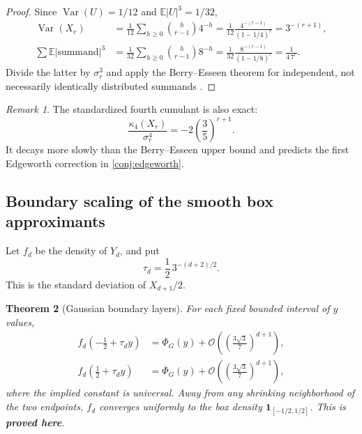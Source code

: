 \documentclass[11pt,oneside]{article}
\numberwithin{equation}{section}
\newtheorem{theorem}{Theorem}[section]
\theoremstyle{definition}
\theoremstyle{remark}
\newtheorem{remark}[theorem]{Remark}
\newcommand{\E}{\mathbb E}
\newcommand{\Var}{\operatorname{Var}}
\newcommand{\bigO}{\mathcal O}
\newcommand{\statusproved}{\textcolor{deepgreen}{\textbf{proved here}}}
\newcommand{\NormalCDF}{\Phi_{\!G}}
\newcommand{\NormalSurv}{\overline{\Phi}_{\!G}}
\begin{document}
\begin{proof}
Since $\Var(U)=1/12$ and $\E|U|^3=1/32$,
\begin{align*}
 \Var(X_r)
 &=\frac1{12}\sum_{h\ge0}\binom h{r-1}4^{-h}
 =\frac1{12}\frac{4^{-(r-1)}}{(1-1/4)^r}
 =3^{-(r+1)},\\
 \sum\E|\text{summand}|^3
 &=\frac1{32}\sum_{h\ge0}\binom h{r-1}8^{-h}
 =\frac1{32}\frac{8^{-(r-1)}}{(1-1/8)^r}
 =\frac1{4\,7^r}.
\end{align*}
Divide the latter by $\sigma_r^3$ and apply the Berry--Esseen theorem for independent,
not necessarily identically distributed summands \cite{petrov1995}.
\end{proof}

\begin{remark}
The standardized fourth cumulant is also exact:
\begin{equation}
 \frac{\kappa_4(X_r)}{\sigma_r^4}
 =-2\left(\frac35\right)^{r+1}.
 \label{eq:pascal-standardized-k4}
\end{equation}
It decays more slowly than the Berry--Esseen upper bound and predicts the first Edgeworth
correction in \cref{conj:edgeworth}.
\end{remark}

\subsection{Boundary scaling of the smooth box approximants}

Let $f_d$ be the density of $Y_d$, and put
\begin{equation}
 \tau_d=\frac12\,3^{-(d+2)/2}.
 \label{eq:tau-d}
\end{equation}
This is the standard deviation of $X_{d+1}/2$.

\begin{theorem}[Gaussian boundary layers]
\label{thm:boundary-layer}
For each fixed bounded interval of $y$ values,
\begin{align}
 f_d\!\left(-\frac12+\tau_dy\right)
 &=\NormalCDF(y)+
   \bigO\!\left(\left(\frac{3\sqrt3}{7}\right)^{d+1}\right),
 \label{eq:left-boundary}\\
 f_d\!\left(\frac12+\tau_dy\right)
 &=\NormalSurv(y)+
   \bigO\!\left(\left(\frac{3\sqrt3}{7}\right)^{d+1}\right),
 \label{eq:right-boundary}
\end{align}
where the implied constant is universal.  Away from any shrinking neighborhood of the two
endpoints, $f_d$ converges uniformly to the box density
$\mathbf1_{[-1/2,1/2]}$.  This is \statusproved.
\end{theorem}
\end{document}
